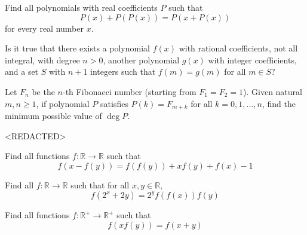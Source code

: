 


 {Find all polynomials with real coefficients $P$ such that
\[P(x) + P(P(x)) = P(x+P(x))\]
for every real number $x$.}

 {Is it true that there exists a polynomial $f(x)$ with rational coefficients, not all integral, with degree $n > 0$, another polynomial $g(x)$ with integer coefficients, and a set $S$ with $n+1$ integers such that $f(m) = g(m)$ for all $m \in S$?}

 {Let $F_n$ be the $n$-th Fibonacci number (starting from $F_1=F_2=1$). Given natural $m,n\ge 1$, if polynomial $P$ satisfies $P(k)=F_{m+k}$ for all $k=0,1,...,n$, find the minimum possible value of $\deg P$.}




 {<REDACTED>}

 {Find all functions $f: \mathbb{R}\rightarrow\mathbb{R}$ such that
\[f(x-f(y))=f(f(y))+xf(y)+f(x)-1\]}

 {Find all $f:\mathbb{R}\rightarrow \mathbb{R}$ such that for all $x,y\in\mathbb{R}$,
$$f(2^x+2y) = 2^yf(f(x))f(y)$$}




 {Find all functions $f: \mathbb{R^+}\rightarrow\mathbb{R^+}$ such that
\[f(xf(y)) = f(x+y)\]}




